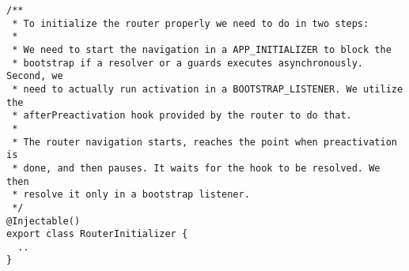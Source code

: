 \begin{verbatim}
/**
 * To initialize the router properly we need to do in two steps:
 *
 * We need to start the navigation in a APP_INITIALIZER to block the
 * bootstrap if a resolver or a guards executes asynchronously. Second, we
 * need to actually run activation in a BOOTSTRAP_LISTENER. We utilize the
 * afterPreactivation hook provided by the router to do that.
 *
 * The router navigation starts, reaches the point when preactivation is
 * done, and then pauses. It waits for the hook to be resolved. We then
 * resolve it only in a bootstrap listener.
 */
@Injectable()
export class RouterInitializer {
  ..
}
\end{verbatim}
